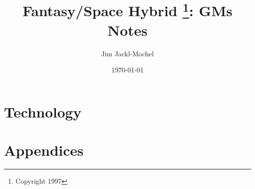 \documentclass{book}
\title{Fantasy/Space Hybrid \thanks{Copyright 1997}: GMs Notes}
\author{Jim Jackl-Mochel}
\date{\today}
\begin{document}

\tableofcontents
\listoftables















\part{Technology}

























\part{Appendices}

\appendix




\end{document}
